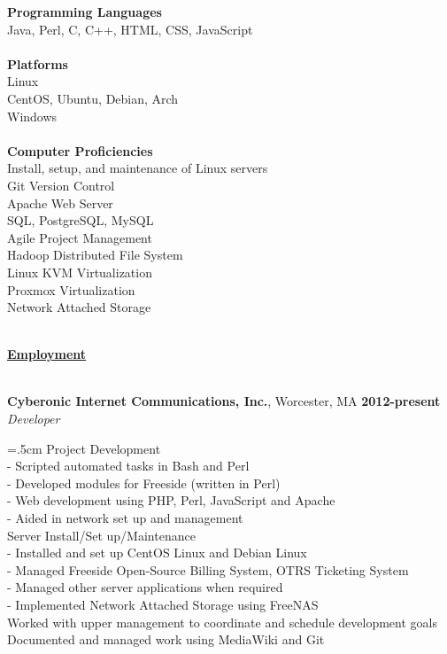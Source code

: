 \documentclass[10pt,notitlepage]{article}
\newenvironment{area}
	{
		\vspace{1em}
		\fontfamily{\sfdefault}\selectfont\begin{singlespace}
	}
	{\\\hrulefill\end{singlespace}\par}
\newcommand{\areaName}[1]{
	\noindent \uline{\hfill\phantom{.}}\\
	\uline{\phantom{.}\hfill{\Large\textbf{#1}}\hfill\phantom{.}}\\
}
\newcommand{\B}[1]{\textbf{#1}}
\newcommand{\I}[1]{\textit{#1}}
\begin{document}
\noindent \B{Programming Languages} \\
\indent Java, Perl, C, C++, HTML, CSS, JavaScript\\\\
\noindent \B{Platforms} \\
\indent Linux \\
\indent \indent CentOS, Ubuntu, Debian, Arch \\
\indent Windows \\\\
\noindent \B{Computer Proficiencies} \\
	\indent Install, setup, and maintenance of Linux servers \\
	\indent Git Version Control \\
	\indent Apache Web Server \\
	\indent SQL, PostgreSQL, MySQL \\
	\indent Agile Project Management \\
	\indent Hadoop Distributed File System \\
	\indent Linux KVM Virtualization \\
	\indent Proxmox Virtualization \\
	\indent Network Attached Storage

\begin{area}
	\areaName{Employment}
\end{area}

\noindent \B{Cyberonic Internet Communications, Inc.}, Worcester, MA
\hfill\B{2012-present}\\
\I{Developer}

\hangindent=.5cm Project Development\\
	\indent - Scripted automated tasks in Bash and Perl\\
	\indent - Developed modules for Freeside (written in Perl)\\
	\indent - Web development using PHP, Perl, JavaScript and Apache\\
	\indent - Aided in network set up and management\\
Server Install/Set up/Maintenance\\
	\indent - Installed and set up CentOS Linux and Debian Linux\\
	\indent - Managed Freeside Open-Source Billing System, OTRS
	Ticketing System\\
	\indent - Managed other server applications when required\\
	\indent - Implemented Network Attached Storage using FreeNAS\\
Worked with upper management to coordinate and schedule development
goals\\
\indent Documented and managed work using MediaWiki and Git\\
\end{document}
